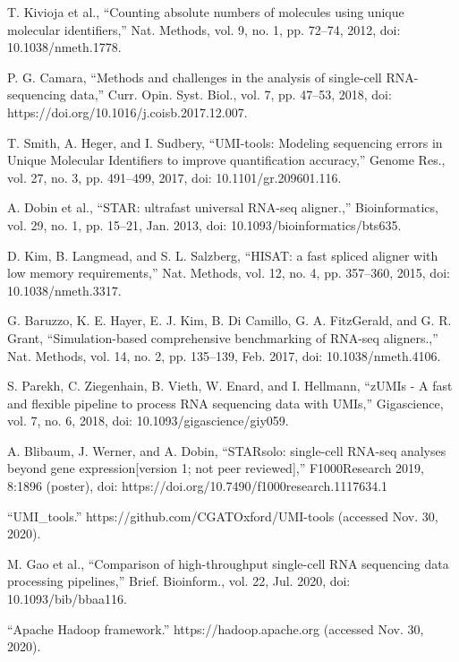 \documentclass[10pt,journal,compsoc]{IEEEtran}
\begin{document}
\begin{thebibliography}{1}
T. Kivioja et al., “Counting absolute numbers of molecules using unique molecular identifiers,” Nat. Methods, vol. 9, no. 1, pp. 72–74, 2012, doi: 10.1038/nmeth.1778.

P. G. Camara, “Methods and challenges in the analysis of single-cell RNA-sequencing data,” Curr. Opin. Syst. Biol., vol. 7, pp. 47–53, 2018, doi: https://doi.org/10.1016/j.coisb.2017.12.007.

T. Smith, A. Heger, and I. Sudbery, “UMI-tools: Modeling sequencing errors in Unique Molecular Identifiers to improve quantification accuracy,” Genome Res., vol. 27, no. 3, pp. 491–499, 2017, doi: 10.1101/gr.209601.116.

A. Dobin et al., “STAR: ultrafast universal RNA-seq aligner.,” Bioinformatics, vol. 29, no. 1, pp. 15–21, Jan. 2013, doi: 10.1093/bioinformatics/bts635.

D. Kim, B. Langmead, and S. L. Salzberg, “HISAT: a fast spliced aligner with low memory requirements,” Nat. Methods, vol. 12, no. 4, pp. 357–360, 2015, doi: 10.1038/nmeth.3317.

G. Baruzzo, K. E. Hayer, E. J. Kim, B. Di Camillo, G. A. FitzGerald, and G. R. Grant, “Simulation-based comprehensive benchmarking of RNA-seq aligners.,” Nat. Methods, vol. 14, no. 2, pp. 135–139, Feb. 2017, doi: 10.1038/nmeth.4106.

S. Parekh, C. Ziegenhain, B. Vieth, W. Enard, and I. Hellmann, “zUMIs - A fast and flexible pipeline to process RNA sequencing data with UMIs,” Gigascience, vol. 7, no. 6, 2018, doi: 10.1093/gigascience/giy059.

A. Blibaum, J. Werner, and A. Dobin, “STARsolo: single-cell RNA-seq analyses beyond gene expression[version 1; not peer reviewed],” F1000Research 2019, 8:1896 (poster), doi: https://doi.org/10.7490/f1000research.1117634.1

“UMI\_tools.” https://github.com/CGATOxford/UMI-tools (accessed Nov. 30, 2020).

M. Gao et al., “Comparison of high-throughput single-cell RNA sequencing data processing pipelines,” Brief. Bioinform., vol. 22, Jul. 2020, doi: 10.1093/bib/bbaa116.

“Apache Hadoop framework.” https://hadoop.apache.org (accessed Nov. 30, 2020).


\end{thebibliography}
\end{document}
